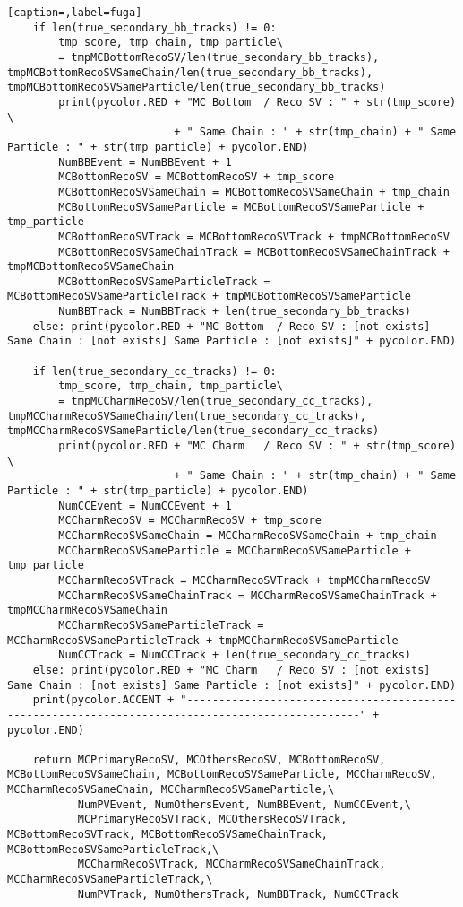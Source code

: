 \begin{lstlisting}[caption=,label=fuga]
    if len(true_secondary_bb_tracks) != 0:
        tmp_score, tmp_chain, tmp_particle\
        = tmpMCBottomRecoSV/len(true_secondary_bb_tracks), tmpMCBottomRecoSVSameChain/len(true_secondary_bb_tracks), tmpMCBottomRecoSVSameParticle/len(true_secondary_bb_tracks)
        print(pycolor.RED + "MC Bottom  / Reco SV : " + str(tmp_score) \
                          + " Same Chain : " + str(tmp_chain) + " Same Particle : " + str(tmp_particle) + pycolor.END)
        NumBBEvent = NumBBEvent + 1
        MCBottomRecoSV = MCBottomRecoSV + tmp_score
        MCBottomRecoSVSameChain = MCBottomRecoSVSameChain + tmp_chain
        MCBottomRecoSVSameParticle = MCBottomRecoSVSameParticle + tmp_particle
        MCBottomRecoSVTrack = MCBottomRecoSVTrack + tmpMCBottomRecoSV
        MCBottomRecoSVSameChainTrack = MCBottomRecoSVSameChainTrack + tmpMCBottomRecoSVSameChain
        MCBottomRecoSVSameParticleTrack = MCBottomRecoSVSameParticleTrack + tmpMCBottomRecoSVSameParticle
        NumBBTrack = NumBBTrack + len(true_secondary_bb_tracks)
    else: print(pycolor.RED + "MC Bottom  / Reco SV : [not exists] Same Chain : [not exists] Same Particle : [not exists]" + pycolor.END)
        
    if len(true_secondary_cc_tracks) != 0:
        tmp_score, tmp_chain, tmp_particle\
        = tmpMCCharmRecoSV/len(true_secondary_cc_tracks), tmpMCCharmRecoSVSameChain/len(true_secondary_cc_tracks), tmpMCCharmRecoSVSameParticle/len(true_secondary_cc_tracks)
        print(pycolor.RED + "MC Charm   / Reco SV : " + str(tmp_score) \
                          + " Same Chain : " + str(tmp_chain) + " Same Particle : " + str(tmp_particle) + pycolor.END)
        NumCCEvent = NumCCEvent + 1
        MCCharmRecoSV = MCCharmRecoSV + tmp_score
        MCCharmRecoSVSameChain = MCCharmRecoSVSameChain + tmp_chain
        MCCharmRecoSVSameParticle = MCCharmRecoSVSameParticle + tmp_particle
        MCCharmRecoSVTrack = MCCharmRecoSVTrack + tmpMCCharmRecoSV
        MCCharmRecoSVSameChainTrack = MCCharmRecoSVSameChainTrack + tmpMCCharmRecoSVSameChain
        MCCharmRecoSVSameParticleTrack = MCCharmRecoSVSameParticleTrack + tmpMCCharmRecoSVSameParticle
        NumCCTrack = NumCCTrack + len(true_secondary_cc_tracks)
    else: print(pycolor.RED + "MC Charm   / Reco SV : [not exists] Same Chain : [not exists] Same Particle : [not exists]" + pycolor.END)
    print(pycolor.ACCENT + "-------------------------------------------------------------------------------------------------" + pycolor.END)
		
    return MCPrimaryRecoSV, MCOthersRecoSV, MCBottomRecoSV, MCBottomRecoSVSameChain, MCBottomRecoSVSameParticle, MCCharmRecoSV, MCCharmRecoSVSameChain, MCCharmRecoSVSameParticle,\
           NumPVEvent, NumOthersEvent, NumBBEvent, NumCCEvent,\
           MCPrimaryRecoSVTrack, MCOthersRecoSVTrack, MCBottomRecoSVTrack, MCBottomRecoSVSameChainTrack, MCBottomRecoSVSameParticleTrack,\
           MCCharmRecoSVTrack, MCCharmRecoSVSameChainTrack, MCCharmRecoSVSameParticleTrack,\
           NumPVTrack, NumOthersTrack, NumBBTrack, NumCCTrack



\end{lstlisting}
